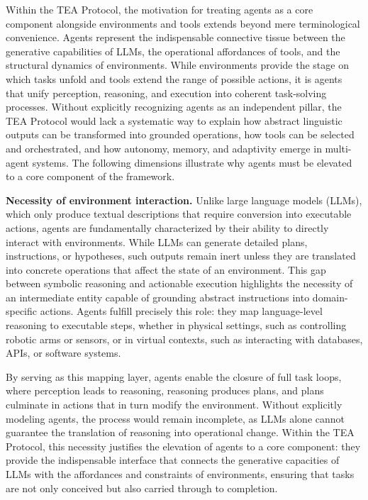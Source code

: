 \documentclass[11pt]{article}
\begin{document}
Within the TEA Protocol, the motivation for treating agents as a core component alongside environments and tools extends beyond mere terminological convenience. Agents represent the indispensable connective tissue between the generative capabilities of LLMs, the operational affordances of tools, and the structural dynamics of environments. While environments provide the stage on which tasks unfold and tools extend the range of possible actions, it is agents that unify perception, reasoning, and execution into coherent task-solving processes. Without explicitly recognizing agents as an independent pillar, the TEA Protocol would lack a systematic way to explain how abstract linguistic outputs can be transformed into grounded operations, how tools can be selected and orchestrated, and how autonomy, memory, and adaptivity emerge in multi-agent systems. The following dimensions illustrate why agents must be elevated to a core component of the framework.


\textbf{Necessity of environment interaction.} Unlike large language models (LLMs), which only produce textual descriptions that require conversion into executable actions, agents are fundamentally characterized by their ability to directly interact with environments. While LLMs can generate detailed plans, instructions, or hypotheses, such outputs remain inert unless they are translated into concrete operations that affect the state of an environment. This gap between symbolic reasoning and actionable execution highlights the necessity of an intermediate entity capable of grounding abstract instructions into domain-specific actions. Agents fulfill precisely this role: they map language-level reasoning to executable steps, whether in physical settings, such as controlling robotic arms or sensors, or in virtual contexts, such as interacting with databases, APIs, or software systems.  

By serving as this mapping layer, agents enable the closure of full task loops, where perception leads to reasoning, reasoning produces plans, and plans culminate in actions that in turn modify the environment. Without explicitly modeling agents, the process would remain incomplete, as LLMs alone cannot guarantee the translation of reasoning into operational change. Within the TEA Protocol, this necessity justifies the elevation of agents to a core component: they provide the indispensable interface that connects the generative capacities of LLMs with the affordances and constraints of environments, ensuring that tasks are not only conceived but also carried through to completion.  
\end{document}
